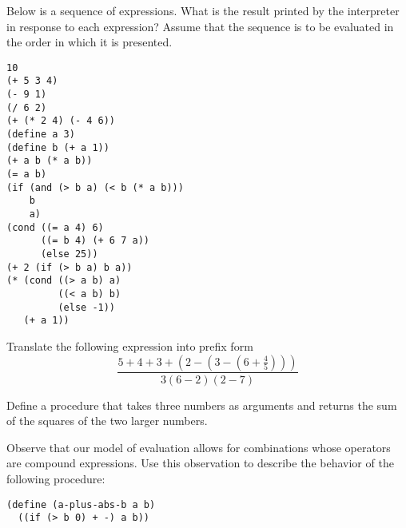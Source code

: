 \begin{Exercise}
  \label{exc:1.1}
Below is a sequence of expressions.  What is the result printed by the
interpreter in response to each expression?  Assume that the sequence
is to be evaluated in the order in which it is presented.

\begin{verbatim}
10
(+ 5 3 4)
(- 9 1)
(/ 6 2)
(+ (* 2 4) (- 4 6))
(define a 3)
(define b (+ a 1))
(+ a b (* a b))
(= a b)
(if (and (> b a) (< b (* a b)))
    b
    a)
(cond ((= a 4) 6)
      ((= b 4) (+ 6 7 a))
      (else 25))
(+ 2 (if (> b a) b a))
(* (cond ((> a b) a)
         ((< a b) b)
         (else -1))
   (+ a 1))
\end{verbatim}
\end{Exercise}

\begin{Exercise}
\label{exc:1.2}
Translate the following expression into prefix form
\begin{equation*}
  \frac{5 + 4 + 3 + (2 - (3 - (6 + \frac{4}{5})))}
  {3 (6-2) (2-7)}
\end{equation*}
\end{Exercise}

\begin{Exercise}
\label{exc:1.3}
Define a procedure that takes three numbers as arguments and returns
the sum of the squares of the two larger numbers.
\end{Exercise}

\begin{Exercise}
\label{exc:1.4}
Observe that our model of evaluation allows for combinations whose
operators are compound expressions.  Use this observation to
describe the behavior of the following procedure:
\begin{verbatim}
(define (a-plus-abs-b a b)
  ((if (> b 0) + -) a b))
\end{verbatim}
\end{Exercise}

